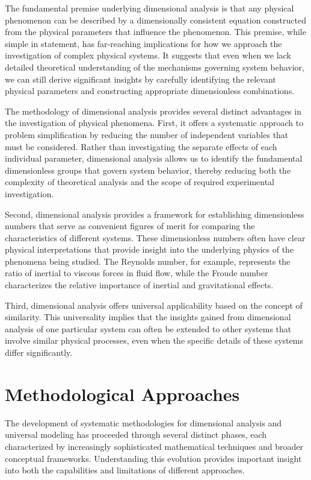 \documentclass[
	11pt, %
	fleqn, %
	a4paper, %
]{LegrandOrangeBook}
\begin{document}
The fundamental premise underlying dimensional analysis is that any physical phenomenon can be described by a dimensionally consistent equation constructed from the physical parameters that influence the phenomenon. This premise, while simple in statement, has far-reaching implications for how we approach the investigation of complex physical systems. It suggests that even when we lack detailed theoretical understanding of the mechanisms governing system behavior, we can still derive significant insights by carefully identifying the relevant physical parameters and constructing appropriate dimensionless combinations.

The methodology of dimensional analysis provides several distinct advantages in the investigation of physical phenomena. First, it offers a systematic approach to problem simplification by reducing the number of independent variables that must be considered. Rather than investigating the separate effects of each individual parameter, dimensional analysis allows us to identify the fundamental dimensionless groups that govern system behavior, thereby reducing both the complexity of theoretical analysis and the scope of required experimental investigation.

Second, dimensional analysis provides a framework for establishing dimensionless numbers that serve as convenient figures of merit for comparing the characteristics of different systems. These dimensionless numbers often have clear physical interpretations that provide insight into the underlying physics of the phenomena being studied. The Reynolds number, for example, represents the ratio of inertial to viscous forces in fluid flow, while the Froude number characterizes the relative importance of inertial and gravitational effects.

Third, dimensional analysis offers universal applicability based on the concept of similarity. This universality implies that the insights gained from dimensional analysis of one particular system can often be extended to other systems that involve similar physical processes, even when the specific details of these systems differ significantly.

\section{Methodological Approaches}

The development of systematic methodologies for dimensional analysis and universal modeling has proceeded through several distinct phases, each characterized by increasingly sophisticated mathematical techniques and broader conceptual frameworks. Understanding this evolution provides important insight into both the capabilities and limitations of different approaches.
\end{document}
